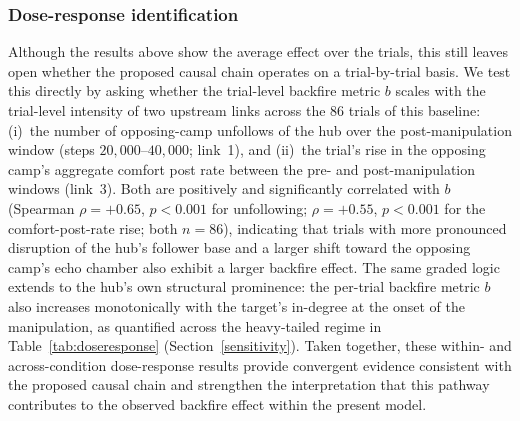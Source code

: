 \documentclass[pdflatex,sn-mathphys-num]{sn-jnl}%
\theoremstyle{thmstyleone}%
\theoremstyle{thmstyletwo}%
\theoremstyle{thmstylethree}%
\begin{document}
\subsubsection{Dose-response identification}\label{sec:seed_dose_id}
Although the results above show the average effect over the trials, this
still leaves open whether the proposed causal chain operates on a
trial-by-trial basis. 
We test this directly by asking whether the trial-level
backfire metric $b$ scales with the trial-level intensity of two upstream
links across the $86$ trials of this baseline: (i)~the number of
opposing-camp unfollows of the hub over the post-manipulation window (steps
$20{,}000$--$40{,}000$; link~1), and (ii)~the trial's rise in the opposing
camp's aggregate comfort post rate between the pre- and post-manipulation
windows (link~3). Both are positively and significantly correlated with $b$
(Spearman $\rho = +0.65$, $p < 0.001$ for unfollowing; $\rho = +0.55$,
$p < 0.001$ for the comfort-post-rate rise; both $n=86$), indicating that
trials with more pronounced disruption of the hub's follower base and a
larger shift toward the opposing camp's echo chamber also exhibit a larger
backfire effect. 
The same graded logic extends to the hub's own structural prominence: the
per-trial backfire metric $b$ also increases monotonically with the
target's in-degree at the onset of the manipulation, as quantified across
the heavy-tailed regime in Table~\ref{tab:doseresponse}
(Section~\ref{sensitivity}). 
Taken together, these within- and across-condition dose-response 
results provide convergent evidence consistent with the 
proposed causal chain and strengthen the interpretation that 
this pathway contributes to the observed backfire effect 
within the present model.
\par
\end{document}

